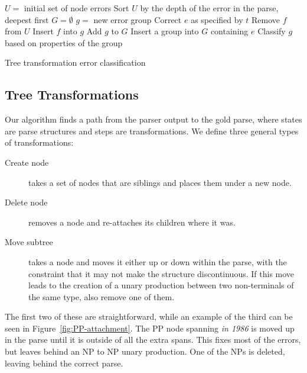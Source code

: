 \begin{algorithm}[t]
\begin{algorithmic}
\State $U =$ initial set of node errors
\State Sort $U$ by the depth of the error in the parse, deepest first
\State $G = \emptyset$
\Repeat
			\State $g =$ new error group
			\State Correct $e$ as specified by $t$
				\State Remove $f$ from $U$
				\State Insert $f$ into $g$
			\EndFor
			\State Add $g$ to $G$
		\EndIf
	\EndFor
{}
	\State Insert a group into $G$ containing $e$
\EndFor
{}
	\State Classify $g$ based on properties of the group
\EndFor
\end{algorithmic}
\caption{ \label{alg:code}
	Tree transformation error classification
}
\end{algorithm}

\subsection{Tree Transformations} \label{sec:tree-transform}

Our algorithm finds a path from the parser output to the gold parse, where states are parse structures and steps are transformations.
We define three general types of transformations:

\begin{description}
  \item[Create node] takes a set of nodes that are siblings and places them under a new node.
  \item[Delete node] removes a node and re-attaches its children where it was.
  \item[Move subtree] takes a node and moves it either up or down within the parse, with the constraint that it may not make the structure discontinuous. If this move leads to the creation of a unary production between two non-terminals of the same type, also remove one of them.
\end{description}

The first two of these are straightforward, while an example of the third can be seen in Figure~\ref{fig:PP-attachment}.
The PP node spanning \emph{in 1986} is moved up in the parse until it is outside of all the extra spans.
This fixes most of the errors, but leaves behind an NP to NP unary production.
One of the NPs is deleted, leaving behind the correct parse.

